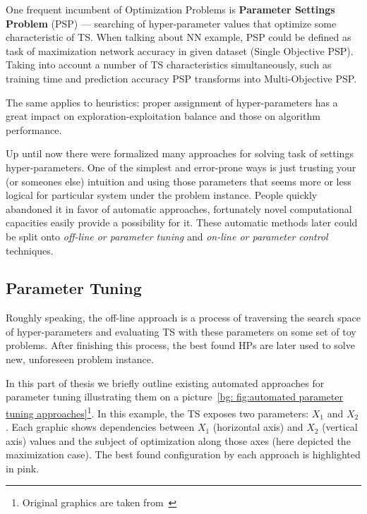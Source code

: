 One frequent incumbent of Optimization Problems is \textbf{Parameter Settings Problem} (PSP) — searching of hyper-parameter values that optimize some characteristic of TS. When talking about NN example, PSP could be defined as task of maximization network accuracy in given dataset (Single Objective PSP). Taking into account a number of TS characteristics simultaneously, such as training time and prediction accuracy PSP transforms into Multi-Objective PSP.

The same applies to heuristics: proper assignment of hyper-parameters has a great impact on exploration-exploitation balance and those on algorithm performance.

Up until now there were formalized many approaches for solving task of settings hyper-parameters. 
One of the simplest and error-prone ways is just trusting your (or someones else) intuition and using those parameters that seems more or less logical for particular system under the problem instance. People quickly abandoned it in favor of automatic approaches, fortunately novel computational capacities easily provide a possibility for it. These automatic methods later could be split onto \textit{off-line or parameter tuning} and \textit{on-line or parameter control} techniques.


\subsection{Parameter Tuning}
Roughly speaking, the off-line approach is a process of traversing the search space of hyper-parameters and evaluating TS with these parameters on some set of toy problems. After finishing this process, the best found HPs are later used to solve new, unforeseen problem instance.

In this part of thesis we briefly outline existing automated approaches for parameter tuning illustrating them on a picture~\ref{bg: fig:automated parameter tuning approaches}\footnote[1]{Original graphics are taken from~\cite{koch2017automated}}. In this example, the TS exposes two parameters: $X_1$ and $X_2$. Each graphic shows dependencies between $X_1$ (horizontal axis) and $X_2$ (vertical axis) values and the subject of optimization along those axes (here depicted the maximization case). The best found configuration by each approach is highlighted in pink.

